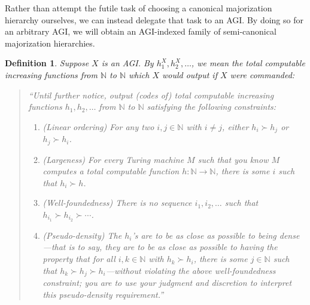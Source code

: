 \documentclass{article}
\newtheorem{definition}[theorem]{Definition}
\begin{document}
Rather than attempt the futile task of choosing a canonical majorization hierarchy
ourselves, we can instead delegate that task to an AGI. By doing so for an arbitrary
AGI, we will obtain an AGI-indexed family of semi-canonical majorization hierarchies.

\begin{definition}
\label{fairsequencedefn}
    Suppose $X$ is an AGI. By $h^X_1,h^X_2,\ldots$, we mean the total computable
    increasing functions
    from $\mathbb N$ to $\mathbb N$ which $X$ would output if $X$ were commanded:
    \begin{quote}
        ``Until further notice, output (codes of) total computable increasing
        functions $h_1,h_2,\ldots$ from $\mathbb N$ to $\mathbb N$ satisfying the
        following constraints:
        \begin{enumerate}
            \item (Linear ordering) For any two $i,j\in\mathbb N$ with $i\neq j$, either
            $h_i\succ h_j$ or $h_j\succ h_i$.
            \item (Largeness) For every Turing machine $M$ such that you know
            $M$ computes a total computable function $h:\mathbb N\to\mathbb N$,
            there is some $i$ such that $h_i\succ h$.
            \item (Well-foundedness) There is no sequence $i_1,i_2,\ldots$ such that
            $h_{i_1}\succ h_{i_2}\succ\cdots$.
            \item (Pseudo-density)
            The $h_i$'s are to be as close as possible to being \emph{dense}---that is
            to say, they are to be as close as possible to having the property that
            for all $i,k\in\mathbb N$ with $h_k\succ h_i$, there is some $j\in\mathbb N$
            such that $h_k\succ h_j\succ h_i$---without violating the above
            well-foundedness constraint; you are to use your judgment and discretion
            to interpret this pseudo-density requirement.''
        \end{enumerate}
    \end{quote}
\end{definition}
\end{document}
